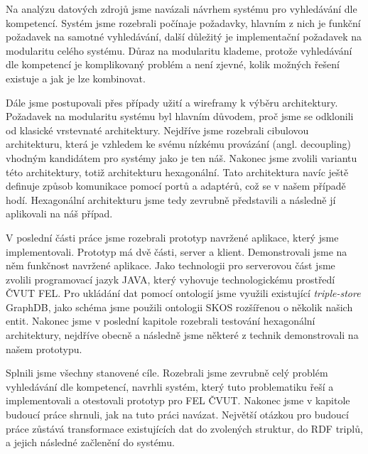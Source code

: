 Na analýzu datových zdrojů jsme navázali návrhem systému pro vyhledávání dle kompetencí. Systém jsme rozebrali počínaje požadavky, hlavním z nich je funkční požadavek na samotné vyhledávání, další důležitý je implementační požadavek na modularitu celého systému. Důraz na modularitu klademe, protože vyhledávání dle kompetencí je komplikovaný problém a není zjevné, kolik možných řešení existuje a jak je lze kombinovat.\par
Dále jsme postupovali přes případy užití a wireframy k výběru architektury. Požadavek na modularitu systému byl hlavním důvodem, proč jsme se odklonili od klasické vrstevnaté architektury. Nejdříve jsme rozebrali cibulovou architekturu, která je vzhledem ke svému nízkému provázání (angl. decoupling) vhodným kandidátem pro systémy jako je ten náš. Nakonec jsme zvolili variantu této architektury, totiž architekturu hexagonální. Tato architektura navíc ještě definuje způsob komunikace pomocí portů a adaptérů, což se v našem případě hodí. Hexagonální architekturu jsme tedy zevrubně představili a následně jí aplikovali na náš případ.\par
V poslední části práce jsme rozebrali prototyp navržené aplikace, který jsme implementovali. Prototyp má dvě části, server a klient. Demonstrovali jsme na něm funkčnost navržené aplikace. Jako technologii pro serverovou část jsme zvolili programovací jazyk JAVA, který vyhovuje technologickému prostředí ČVUT FEL. Pro ukládání dat pomocí ontologií jsme využili existující \textit{triple-store} GraphDB, jako schéma jsme použili ontologii SKOS rozšířenou o několik našich entit. Nakonec jsme v poslední kapitole rozebrali testování hexagonální architektury, nejdříve obecně a následně jsme některé z technik demonstrovali na našem prototypu.\par
Splnili jsme všechny stanovené cíle. Rozebrali jsme zevrubně celý problém vyhledávání dle kompetencí, navrhli systém, který tuto problematiku řeší a implementovali a otestovali prototyp pro FEL ČVUT. Nakonec jsme v kapitole budoucí práce shrnuli, jak na tuto práci navázat. Největší otázkou pro budoucí práce zůstává transformace existujících dat do zvolených struktur, do RDF triplů, a jejich následné začlenění do systému.







